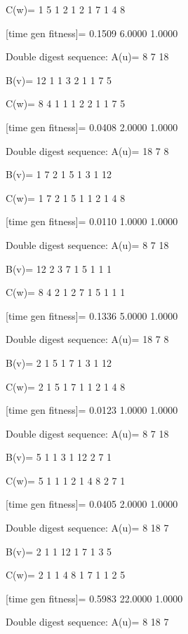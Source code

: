 C(w)=
     1     5     1     2     1     2     1     7     1     4     8

[time gen fitness]=
    0.1509    6.0000    1.0000

Double digest sequence:
A(u)=
     8     7    18

B(v)=
    12     1     1     3     2     1     1     7     5

C(w)=
     8     4     1     1     1     2     2     1     1     7     5

[time gen fitness]=
    0.0408    2.0000    1.0000

Double digest sequence:
A(u)=
    18     7     8

B(v)=
     1     7     2     1     5     1     3     1    12

C(w)=
     1     7     2     1     5     1     1     2     1     4     8

[time gen fitness]=
    0.0110    1.0000    1.0000

Double digest sequence:
A(u)=
     8     7    18

B(v)=
    12     2     3     7     1     5     1     1     1

C(w)=
     8     4     2     1     2     7     1     5     1     1     1

[time gen fitness]=
    0.1336    5.0000    1.0000

Double digest sequence:
A(u)=
    18     7     8

B(v)=
     2     1     5     1     7     1     3     1    12

C(w)=
     2     1     5     1     7     1     1     2     1     4     8

[time gen fitness]=
    0.0123    1.0000    1.0000

Double digest sequence:
A(u)=
     8     7    18

B(v)=
     5     1     1     3     1    12     2     7     1

C(w)=
     5     1     1     1     2     1     4     8     2     7     1

[time gen fitness]=
    0.0405    2.0000    1.0000

Double digest sequence:
A(u)=
     8    18     7

B(v)=
     2     1     1    12     1     7     1     3     5

C(w)=
     2     1     1     4     8     1     7     1     1     2     5

[time gen fitness]=
    0.5983   22.0000    1.0000

Double digest sequence:
A(u)=
     8    18     7

